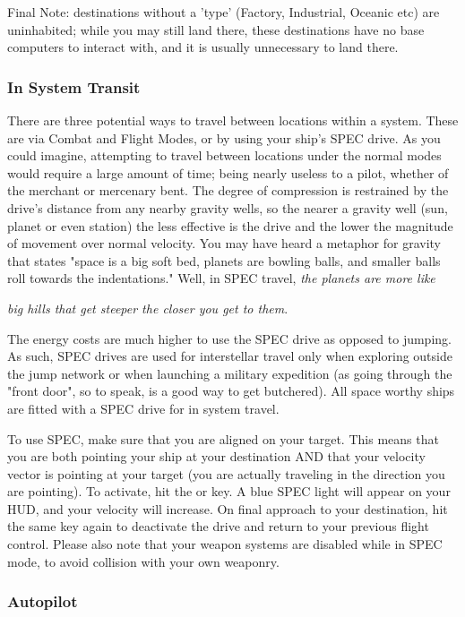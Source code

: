 \documentclass{article}
\newcommand{\key}[1]{%
  \tikz[baseline=(key.base)]{
    \node[draw=gray!50, fill=gray!5, rounded corners=2pt, inner sep=2pt, minimum height=1.5ex] (key) {\footnotesize\sffamily\bfseries #1};
  }%
}
\begin{document}
Final Note: destinations without a 'type' (Factory, Industrial, Oceanic etc) are uninhabited; while you may still land there, these destinations have no base computers to interact with, and it is usually unnecessary to land there. 



\subsubsection{ In System Transit }

There are three potential ways to travel between locations within a system.  These are via Combat and Flight Modes, or by using your ship's SPEC drive. As you could imagine, attempting to travel between locations under the normal modes would require a large amount of time; being nearly useless to a pilot, whether of the merchant or mercenary bent. The degree of compression is restrained by the drive's distance from any nearby gravity wells, so the nearer a gravity well (sun, planet or even station) the less effective is the drive and the lower the magnitude of movement over normal velocity. You may have heard a metaphor for gravity that states "space is a big soft bed, planets are bowling balls, and smaller balls roll towards the indentations." Well, in SPEC travel, \textit{the planets are more like}

\textit{big hills that get steeper the closer you get to them}. 

The energy costs are much higher to use the SPEC drive as opposed to jumping. As such, SPEC drives are used for interstellar travel only when exploring outside the jump network or when launching a military expedition (as going through the "front door", so to speak, is a good way to get butchered). All space worthy ships are fitted with a SPEC drive for in system travel. 

To use SPEC, make sure that you are aligned on your target. This means that you are both pointing your ship at your destination AND that your velocity vector is pointing at your target (you are actually traveling in the direction you are pointing). To activate, hit the \key{a} or \key{A} key. A blue SPEC light will appear on your HUD, and your velocity will increase. On final approach to your destination, hit the same key again to deactivate the drive and return to your previous flight control.  Please also note that your weapon systems are disabled while in SPEC mode, to avoid collision with your own weaponry. 

\subsubsection{ Autopilot }
\end{document}
